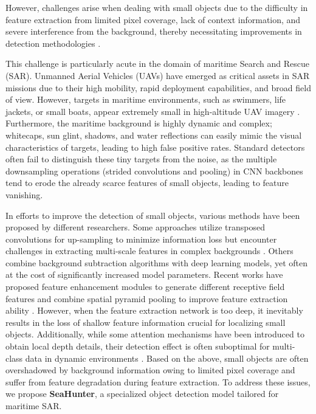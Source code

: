 \documentclass[lettersize,journal]{IEEEtran}
\begin{document}
\IEEEpubidadjcol

However, challenges arise when dealing with small objects due to the difficulty in feature extraction from limited pixel coverage, lack of context information, and severe interference from the background, thereby necessitating improvements in detection methodologies \cite{ref11}.

This challenge is particularly acute in the domain of maritime Search and Rescue (SAR). Unmanned Aerial Vehicles (UAVs) have emerged as critical assets in SAR missions due to their high mobility, rapid deployment capabilities, and broad field of view. However, targets in maritime environments, such as swimmers, life jackets, or small boats, appear extremely small in high-altitude UAV imagery \cite{b2}. Furthermore, the maritime background is highly dynamic and complex; whitecaps, sun glint, shadows, and water reflections can easily mimic the visual characteristics of targets, leading to high false positive rates. Standard detectors often fail to distinguish these tiny targets from the noise, as the multiple downsampling operations (strided convolutions and pooling) in CNN backbones tend to erode the already scarce features of small objects, leading to feature vanishing.

In efforts to improve the detection of small objects, various methods have been proposed by different researchers. Some approaches utilize transposed convolutions for up-sampling to minimize information loss but encounter challenges in extracting multi-scale features in complex backgrounds \cite{ref12}. Others combine background subtraction algorithms with deep learning models, yet often at the cost of significantly increased model parameters. Recent works have proposed feature enhancement modules to generate different receptive field features and combine spatial pyramid pooling to improve feature extraction ability \cite{ref13}. However, when the feature extraction network is too deep, it inevitably results in the loss of shallow feature information crucial for localizing small objects. Additionally, while some attention mechanisms have been introduced to obtain local depth details, their detection effect is often suboptimal for multi-class data in dynamic environments \cite{ref14}. Based on the above, small objects are often overshadowed by background information owing to limited pixel coverage and suffer from feature degradation during feature extraction. To address these issues, we propose \textbf{SeaHunter}, a specialized object detection model tailored for maritime SAR.
\end{document}
